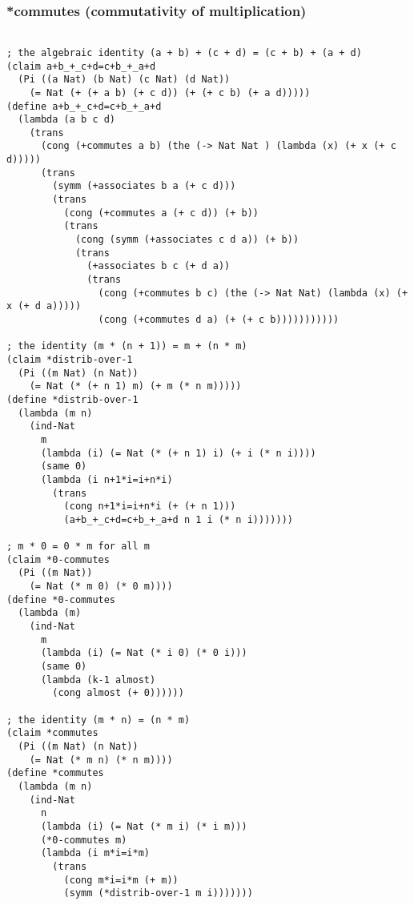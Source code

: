 \subsubsection{*commutes (commutativity of multiplication)} \label{code:*commutes}
\begin{lstlisting}

; the algebraic identity (a + b) + (c + d) = (c + b) + (a + d)
(claim a+b_+_c+d=c+b_+_a+d
  (Pi ((a Nat) (b Nat) (c Nat) (d Nat))
    (= Nat (+ (+ a b) (+ c d)) (+ (+ c b) (+ a d)))))
(define a+b_+_c+d=c+b_+_a+d
  (lambda (a b c d)
    (trans
      (cong (+commutes a b) (the (-> Nat Nat ) (lambda (x) (+ x (+ c d)))))
      (trans
        (symm (+associates b a (+ c d)))
        (trans
          (cong (+commutes a (+ c d)) (+ b))
          (trans
            (cong (symm (+associates c d a)) (+ b))
            (trans
              (+associates b c (+ d a))
              (trans
                (cong (+commutes b c) (the (-> Nat Nat) (lambda (x) (+ x (+ d a)))))
                (cong (+commutes d a) (+ (+ c b)))))))))))

; the identity (m * (n + 1)) = m + (n * m)
(claim *distrib-over-1
  (Pi ((m Nat) (n Nat))
    (= Nat (* (+ n 1) m) (+ m (* n m)))))
(define *distrib-over-1
  (lambda (m n)
    (ind-Nat
      m
      (lambda (i) (= Nat (* (+ n 1) i) (+ i (* n i))))
      (same 0)
      (lambda (i n+1*i=i+n*i)
        (trans
          (cong n+1*i=i+n*i (+ (+ n 1)))
          (a+b_+_c+d=c+b_+_a+d n 1 i (* n i)))))))

; m * 0 = 0 * m for all m
(claim *0-commutes
  (Pi ((m Nat))
    (= Nat (* m 0) (* 0 m))))
(define *0-commutes
  (lambda (m)
    (ind-Nat
      m
      (lambda (i) (= Nat (* i 0) (* 0 i)))
      (same 0)
      (lambda (k-1 almost)
        (cong almost (+ 0))))))

; the identity (m * n) = (n * m)
(claim *commutes
  (Pi ((m Nat) (n Nat))
    (= Nat (* m n) (* n m))))
(define *commutes
  (lambda (m n)
    (ind-Nat
      n
      (lambda (i) (= Nat (* m i) (* i m)))
      (*0-commutes m)
      (lambda (i m*i=i*m)
        (trans
          (cong m*i=i*m (+ m))
          (symm (*distrib-over-1 m i)))))))
\end{lstlisting}

